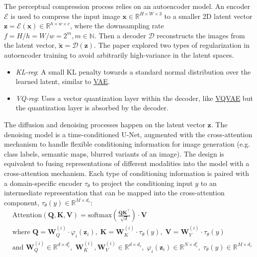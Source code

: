\documentclass[12pt]{article}
\begin{document}
The perceptual compression process relies on an autoencoder model. An encoder $\mathcal{E}$ is used to compress the input image $\mathbf{x} \in \mathbb{R}^{H \times W \times 3}$ to a smaller 2D latent vector $\mathbf{z} = \mathcal{E}(\mathbf{x}) \in \mathbb{R}^{h \times w \times c}$, where the downsampling rate $f=H/h=W/w=2^m, m \in \mathbb{N}$. Then a decoder $\mathcal{D}$ reconstructs the images from the latent vector, $\tilde{\mathbf{x}} = \mathcal{D}(\mathbf{z})$. The paper explored two types of regularization in autoencoder training to avoid arbitrarily high-variance in the latent spaces.
\begin{itemize}
    \item \emph{KL-reg}: A small KL penalty towards a standard normal distribution over the learned latent, similar to \href{https://lilianweng.github.io/posts/2018-08-12-vae/}{VAE}.
    \item \emph{VQ-reg}: Uses a vector quantization layer within the decoder, like \href{https://lilianweng.github.io/posts/2018-08-12-vae/#vq-vae-and-vq-vae-2}{VQVAE} but the quantization layer is absorbed by the decoder.
\end{itemize}

The diffusion and denoising processes happen on the latent vector $\mathbf{z}$. The denoising model is a time-conditioned U-Net, augmented with the cross-attention mechanism to handle flexible conditioning information for image generation (e.g. class labels, semantic maps, blurred variants of an image). The design is equivalent to fusing representations of different modalities into the model with a cross-attention mechanism. Each type of conditioning information is paired with a domain-specific encoder $\tau_\theta$ to project the conditioning input $y$ to an intermediate representation that can be mapped into the cross-attention component, $\tau_\theta(y) \in \mathbb{R}^{M \times d_\tau}$:
\[
\begin{aligned}
&\text{Attention}(\mathbf{Q}, \mathbf{K}, \mathbf{V}) = \text{softmax}\left(\frac{\mathbf{Q}\mathbf{K}^\top}{\sqrt{d}}\right) \cdot \mathbf{V} \\
&\text{where }\mathbf{Q} = \mathbf{W}^{(i)}_Q \cdot \varphi_i(\mathbf{z}_i),\;
\mathbf{K} = \mathbf{W}^{(i)}_K \cdot \tau_\theta(y),\;
\mathbf{V} = \mathbf{W}^{(i)}_V \cdot \tau_\theta(y) \\
&\text{and }
\mathbf{W}^{(i)}_Q \in \mathbb{R}^{d \times d^i_\epsilon},\;
\mathbf{W}^{(i)}_K, \mathbf{W}^{(i)}_V \in \mathbb{R}^{d \times d_\tau},\;
\varphi_i(\mathbf{z}_i) \in \mathbb{R}^{N \times d^i_\epsilon},\;
\tau_\theta(y) \in \mathbb{R}^{M \times d_\tau}
\end{aligned}
\]
\end{document}
